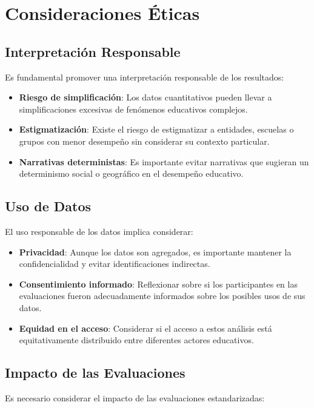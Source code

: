 \section{Consideraciones Éticas}

\subsection{Interpretación Responsable}
Es fundamental promover una interpretación responsable de los resultados:

\begin{itemize}
    \item \textbf{Riesgo de simplificación}: Los datos cuantitativos pueden llevar a simplificaciones excesivas de fenómenos educativos complejos.
    
    \item \textbf{Estigmatización}: Existe el riesgo de estigmatizar a entidades, escuelas o grupos con menor desempeño sin considerar su contexto particular.
    
    \item \textbf{Narrativas deterministas}: Es importante evitar narrativas que sugieran un determinismo social o geográfico en el desempeño educativo.
\end{itemize}

\subsection{Uso de Datos}
El uso responsable de los datos implica considerar:

\begin{itemize}
    \item \textbf{Privacidad}: Aunque los datos son agregados, es importante mantener la confidencialidad y evitar identificaciones indirectas.
    
    \item \textbf{Consentimiento informado}: Reflexionar sobre si los participantes en las evaluaciones fueron adecuadamente informados sobre los posibles usos de sus datos.
    
    \item \textbf{Equidad en el acceso}: Considerar si el acceso a estos análisis está equitativamente distribuido entre diferentes actores educativos.
\end{itemize}

\subsection{Impacto de las Evaluaciones}
Es necesario considerar el impacto de las evaluaciones estandarizadas:

